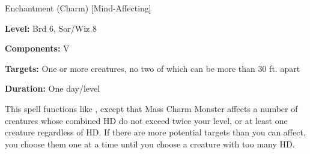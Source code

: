 \label{spell:Mass Charm Monster}

Enchantment (Charm) [Mind-Affecting]

\textbf{Level:} Brd 6, Sor/Wiz 8

\textbf{Components:} V

\textbf{Targets:} One or more creatures, no two of which can be more than 30 ft. 
apart

\textbf{Duration:} One day/level

This spell functions like , except that Mass Charm 
Monster affects a number of creatures whose combined HD do not exceed twice your 
level, or at least one creature regardless of HD. If there are more potential targets 
than you can affect, you choose them one at a time until you choose a creature 
with too many HD.

